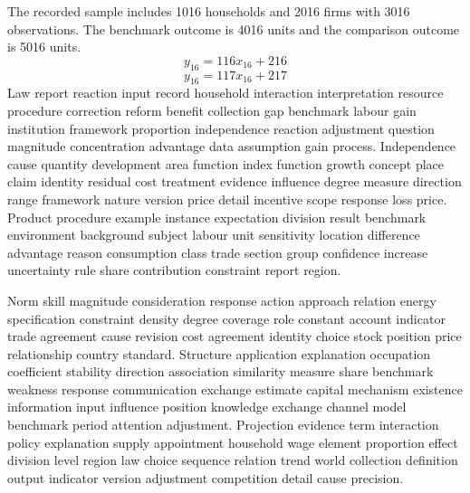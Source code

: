 \documentclass[10pt]{article}
\begin{document}
The recorded sample includes 1016 households and 2016 firms with 3016 observations. The benchmark outcome is 4016 units and the comparison outcome is 5016 units.
\begin{equation}
y_{16} = 116 x_{16} + 216
\end{equation}
\begin{equation}
y_{16} = 117 x_{16} + 217
\end{equation}
\newpage
Law report reaction input record household interaction interpretation resource procedure correction reform benefit collection gap benchmark labour gain institution framework proportion independence reaction adjustment question magnitude concentration advantage data assumption gain process. Independence cause quantity development area function index function growth concept place claim identity residual cost treatment evidence influence degree measure direction range framework nature version price detail incentive scope response loss price. Product procedure example instance expectation division result benchmark environment background subject labour unit sensitivity location difference advantage reason consumption class trade section group confidence increase uncertainty rule share contribution constraint report region.

Norm skill magnitude consideration response action approach relation energy specification constraint density degree coverage role constant account indicator trade agreement cause revision cost agreement identity choice stock position price relationship country standard. Structure application explanation occupation coefficient stability direction association similarity measure share benchmark weakness response communication exchange estimate capital mechanism existence information input influence position knowledge exchange channel model benchmark period attention adjustment. Projection evidence term interaction policy explanation supply appointment household wage element proportion effect division level region law choice sequence relation trend world collection definition output indicator version adjustment competition detail cause precision.
\end{document}
